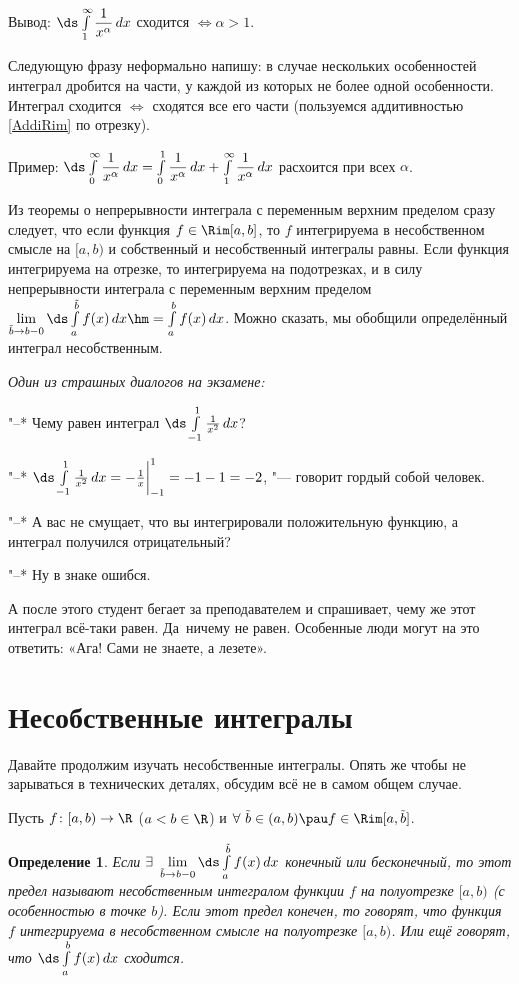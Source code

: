 \documentclass[a4paper,10pt,twoside]{article}
\newtheorem{Def}{Определение}[section]
\newenvironment{Zam}
     	{\par\noindent{\textbf{Замечание.}}}{}
\let\AVsection\section{}
\renewcommand\section{\newpage\scol\AVsection}
\newcommand{\scol}{  \renewcommand{\headrulewidth}{0.5pt}\fancyhead[RE,LO]{\thesection{} \leftmark} \fancyhead[LE,RO]{\thepage}}
\begin{document}
   Вывод: $\ds\int\limits_1^\infty\dfrac1{x^\alpha}\,dx$ сходится $\iff\alpha>1$. 
   
   Следующую фразу неформально напишу: в случае нескольких особенностей интеграл дробится на части, у каждой из которых не более одной особенности.
   Интеграл сходится $\iff$ сходятся все его части (пользуемся аддитивностью \ref{AddiRim} по отрезку).
   
   Пример: $\ds\int\limits_0^{\infty}\dfrac1{x^\alpha}\,dx=\int\limits_0^1\dfrac1{x^\alpha}\,dx+\int\limits_1^\infty\dfrac1{x^\alpha}\,dx$ расхоится при всех $\alpha$.
   
   \begin{Zam}
   	Из теоремы о непрерывности интеграла с переменным верхним пределом сразу следует, что если функция $f\in\Rim[a,b]$, то $f$ интегрируема в
   	несобственном смысле на $[a,b)$ и собственный и несобственный интегралы равны.
   Если функция интегрируема на отрезке, то интегрируема на подотрезках, и в силу непрерывности 
   интеграла с переменным верхним пределом $\lim\limits_{\tilde b\to b-0}\ds\int\limits_a^{\tilde b}f(x)\,dx\hm=\int\limits_a^bf(x)\,dx$.
   Можно сказать, мы обобщили определённый интеграл несобственным.
   \end{Zam}
   
   \slshape Один из страшных диалогов на экзамене:
   
   "--* Чему равен интеграл $\ds\int\limits_{-1}^1\frac1{x^2}\,dx$?
   
   "--* $\ds\int\limits_{-1}^1\frac1{x^2}\,dx=-\frac1x\bigg|_{-1}^1=-1-1=-2$, "--- говорит гордый собой человек.
   
   "--* А вас не смущает, что вы интегрировали положительную функцию, а интеграл получился отрицательный?
   
   "--* Ну в знаке ошибся.
   
   \rm А после этого студент бегает за преподавателем и спрашивает, чему же этот интеграл всё-таки равен. Да~ничему не равен.
   Особенные люди могут на это ответить: «Ага! Сами не знаете, а лезете».
   
   \section{Несобственные интегралы}
   Давайте продолжим изучать несобственные интегралы. Опять же чтобы не зарываться в технических деталях, обсудим всё не в самом общем случае.
   
   Пусть $f\colon[a,b)\to \R$ \pau($a<b\in\R$) и $\forall\  \tilde b\in(a,b)\pau f\in\Rim[a,\tilde b]$.
   \begin{Def}
   	Если $\exists\ \lim\limits_{\tilde b\to b-0}\ds\int\limits_a^{\tilde b}f(x)\,dx$ конечный или бесконечный, то этот предел называют несобственным интегралом функции $f$ на полуотрезке $[a,b)$
   	(с особенностью в точке $b$). Если этот предел конечен, то говорят, что функция $f$ интегрируема в несобственном смысле на полуотрезке $[a,b)$.
   	Или ещё говорят, что $\ds\int\limits_a^bf(x)\,dx$ сходится.
   \end{Def}
   
\end{document}
